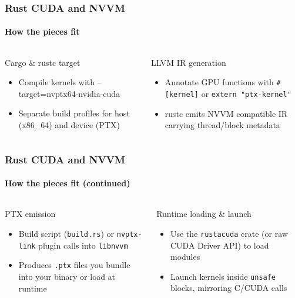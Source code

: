 \documentclass[aspectratio=169]{beamer}
\begin{document}
\begin{frame}
	\frametitle{Rust CUDA and NVVM}
	\framesubtitle{How the pieces fit}

	\begin{columns}[T]
		\begin{column}{0.4\textwidth}
			Cargo \& rustc target \fnmark
			\begin{itemize}
				\item Compile kernels with --target=nvptx64-nvidia-cuda
				\item Separate build profiles for host (x86\_64) and device (PTX)
			\end{itemize}
		\end{column}
		\begin{column}{0.4\textwidth}
			LLVM IR generation
			\begin{itemize}
				\item Annotate GPU functions with \texttt{\#[kernel]} or \texttt{extern "ptx-kernel"}
				\item rustc emits NVVM compatible IR carrying thread/block metadata
			\end{itemize}
		\end{column}
	\end{columns}
\end{frame}

\begin{frame}
	\frametitle{Rust CUDA and NVVM}
	\framesubtitle{How the pieces fit (continued)}

	\begin{columns}[T]
		\begin{column}{0.4\textwidth}
			PTX emission
			\begin{itemize}
				\item Build script (\texttt{build.rs}) or \Verb|nvptx-link| plugin calls into \Verb|libnvvm|
				\item Produces \Verb|.ptx| files you bundle into your binary or load at runtime
			\end{itemize}
		\end{column}
		\begin{column}{0.4\textwidth}
			Runtime loading \& launch
			\begin{itemize}
				\item Use the \Verb|rustacuda| crate (or raw CUDA Driver API) to load modules
				\item Launch kernels inside \Verb|unsafe| blocks, mirroring C/CUDA calls
			\end{itemize}
		\end{column}
	\end{columns}
\end{frame}
\end{document}
